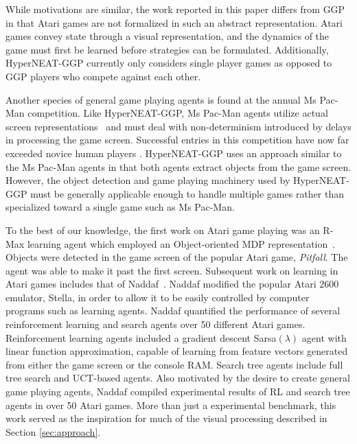 \documentclass{acm_proc_article-sp}
\begin{document}
While motivations are similar, the work reported in this paper differs from GGP in that Atari games are not formalized in such an abstract representation. Atari games convey state through a visual representation, and the dynamics of the game must first be learned before strategies can be formulated. Additionally, HyperNEAT-GGP currently only considers single player games as opposed to GGP players who compete against each other.

Another species of general game playing agents is found at the annual Ms Pac-Man competition. Like HyperNEAT-GGP, Ms Pac-Man agents utilize actual screen representations~\cite{pacmancompetition} and must deal with non-determinism introduced by delays in processing the game screen. Successful entries in this competition have now far exceeded novice human players \cite{sigevolution2007}. HyperNEAT-GGP uses an approach similar to the Ms Pac-Man agents in that both agents extract objects from the game screen. However, the object detection and game playing machinery used by HyperNEAT-GGP must be generally applicable enough to handle multiple games rather than specialized toward a single game such as Ms Pac-Man.

To the best of our knowledge, the first work on Atari game playing was an R-Max learning agent which employed an Object-oriented MDP representation~\cite{duik08}. Objects were detected in the game screen of the popular Atari game, \emph{Pitfall}. The agent was able to make it past the first screen. Subsequent work on learning in Atari games includes that of Naddaf~\cite{naddaf10}. Naddaf modified the popular Atari 2600 emulator, Stella, in order to allow it to be easily controlled by computer programs such as learning agents. Naddaf quantified the performance of several reinforcement learning and search agents over 50 different Atari games. Reinforcement learning agents included a gradient descent Sarsa$(\lambda)$ agent with linear function approximation, capable of learning from feature vectors generated from either the game screen or the console RAM. Search tree agents include full tree search and UCT-based agents. Also motivated by the desire to create general game playing agents, Naddaf compiled experimental results of RL and search tree agents in over 50 Atari games. More than just a experimental benchmark, this work served as the inspiration for much of the visual processing described in Section \ref{sec:approach}.
\end{document}
